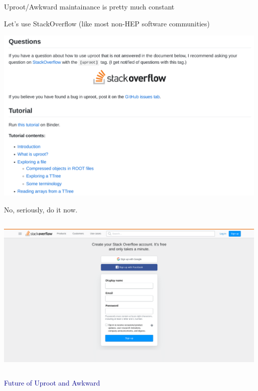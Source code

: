 \documentclass[aspectratio=169]{beamer}
\begin{document}
\begin{frame}{Uproot/Awkward maintainance is pretty much constant}
\vspace{0.25 cm}
\begin{center}
\end{center}
\end{frame}

\begin{frame}{Let's use StackOverflow (like most non-HEP software communities)}
\begin{center}
\includegraphics[width=0.88\linewidth]{uproot-stackoverflow.png}
\end{center}
\end{frame}

\begin{frame}{No, seriously, do it now.}
\vspace{0.15 cm}
\begin{columns}
\includegraphics[width=\linewidth]{stackoverflow-signup.png}
\end{columns}
\end{frame}

\begin{frame}{}
\huge
\vspace{1 cm}
\begin{center}
\textcolor{darkblue}{Future of Uproot and Awkward}
\end{center}
\end{frame}
\end{document}
